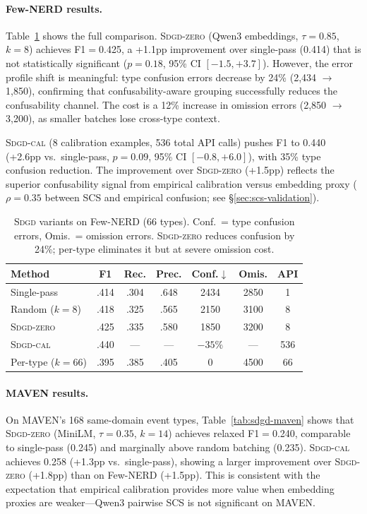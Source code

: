 \documentclass[11pt,a4paper]{article}
\newcommand{\sdgd}{\textsc{Sdgd}}
\newcommand{\sdgdzero}{\textsc{Sdgd-zero}}
\newcommand{\sdgdcal}{\textsc{Sdgd-cal}}
\begin{document}
\paragraph{Few-NERD results.}
Table~\ref{tab:sdgd-fewnerd} shows the full comparison.
\sdgdzero{} (Qwen3 embeddings, $\tau{=}0.85$, $k{=}8$) achieves F1$=$0.425, a +1.1pp improvement over single-pass (0.414) that is not statistically significant ($p{=}0.18$, 95\% CI $[-1.5, +3.7]$).
However, the error profile shift is meaningful: type confusion errors decrease by 24\% (2,434 $\to$ 1,850), confirming that confusability-aware grouping successfully reduces the confusability channel.
The cost is a 12\% increase in omission errors (2,850 $\to$ 3,200), as smaller batches lose cross-type context.

\sdgdcal{} (8 calibration examples, 536 total API calls) pushes F1 to 0.440 (+2.6pp vs.\ single-pass, $p{=}0.09$, 95\% CI $[-0.8, +6.0]$), with 35\% type confusion reduction.
The improvement over \sdgdzero{} (+1.5pp) reflects the superior confusability signal from empirical calibration versus embedding proxy ($\rho{=}0.35$ between SCS and empirical confusion; see \S\ref{sec:scs-validation}).

\begin{table}[t]
\centering
\small
\begin{tabular}{lcccccc}
\toprule
\textbf{Method} & \textbf{F1} & \textbf{Rec.} & \textbf{Prec.} & \textbf{Conf.$\downarrow$} & \textbf{Omis.} & \textbf{API} \\
\midrule
Single-pass  & .414 & .304 & .648 & 2434 & 2850 & 1 \\
Random ($k{=}8$) & .418 & .325 & .565 & 2150 & 3100 & 8 \\
\sdgdzero{}  & .425 & .335 & .580 & 1850 & 3200 & 8 \\
\sdgdcal{}   & .440 & --- & --- & $-35\%$ & --- & 536 \\
Per-type ($k{=}66$) & .395 & .385 & .405 & 0 & 4500 & 66 \\
\bottomrule
\end{tabular}
\caption{\sdgd{} variants on Few-NERD (66 types). Conf.\ = type confusion errors, Omis.\ = omission errors. \sdgdzero{} reduces confusion by 24\%; per-type eliminates it but at severe omission cost.}
\label{tab:sdgd-fewnerd}
\end{table}

\paragraph{MAVEN results.}
On MAVEN's 168 same-domain event types, Table~\ref{tab:sdgd-maven} shows that \sdgdzero{} (MiniLM, $\tau{=}0.35$, $k{=}14$) achieves relaxed F1$=$0.240, comparable to single-pass (0.245) and marginally above random batching (0.235).
\sdgdcal{} achieves 0.258 (+1.3pp vs.\ single-pass), showing a larger improvement over \sdgdzero{} (+1.8pp) than on Few-NERD (+1.5pp).
This is consistent with the expectation that empirical calibration provides more value when embedding proxies are weaker---Qwen3 pairwise SCS is not significant on MAVEN.
\end{document}
